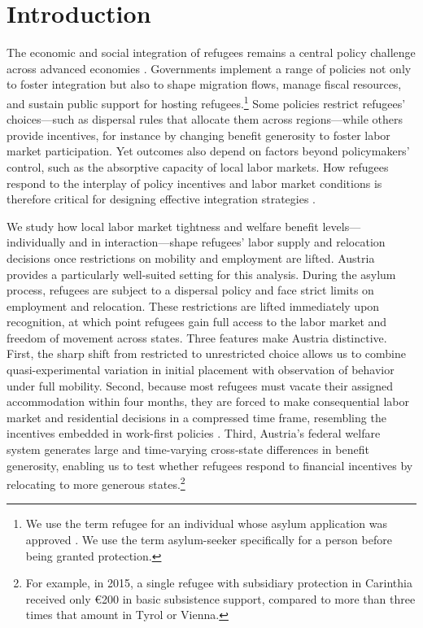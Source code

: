\section{Introduction}

The economic and social integration of refugees remains a central policy challenge across advanced economies \citep{brell_labor_2020}. Governments implement a range of policies not only to foster integration but also to shape migration flows, manage fiscal resources, and sustain public support for hosting refugees.\footnote{We use the term refugee for an individual whose asylum application was approved \citep{hatton2020}. We use the term asylum-seeker specifically for a person before being granted protection.} Some policies restrict refugees’ choices—such as dispersal rules that allocate them across regions—while others provide incentives, for instance by changing benefit generosity to foster labor market participation. Yet outcomes also depend on factors beyond policymakers’ control, such as the absorptive capacity of local labor markets. How refugees respond to the interplay of policy incentives and labor market conditions is therefore critical for designing effective integration strategies \citep{adda2022}.

We study how local labor market tightness and welfare benefit levels---individually and in interaction---shape refugees’ labor supply and relocation decisions once restrictions on mobility and employment are lifted. Austria provides a particularly well-suited setting for this analysis. During the asylum process, refugees are subject to a dispersal policy and face strict limits on employment and relocation. These restrictions are lifted immediately upon recognition, at which point refugees gain full access to the labor market and freedom of movement across states. Three features make Austria distinctive. First, the sharp shift from restricted to unrestricted choice allows us to combine quasi-experimental variation in initial placement with observation of behavior under full mobility. Second, because most refugees must vacate their assigned accommodation within four months, they are forced to make consequential labor market and residential decisions in a compressed time frame, resembling the incentives embedded in work-first policies \citep{arendt_labor_2022, arendt_trade-offs_2023}. Third, Austria’s federal welfare system generates large and time-varying cross-state differences in benefit generosity, enabling us to test whether refugees respond to financial incentives by relocating to more generous states.\footnote{For example, in 2015, a single refugee with subsidiary protection in Carinthia received only €200 in basic subsistence support, compared to more than three times that amount in Tyrol or Vienna.}

